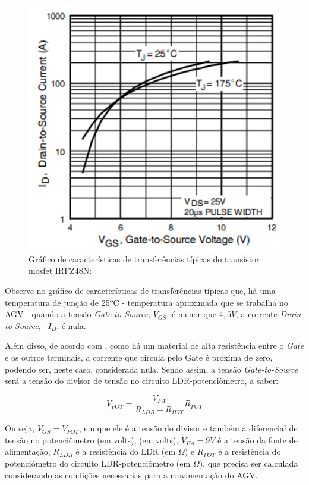 \documentclass[portuguese]{textolivre}
\begin{document}
\begin{figure}[h!]
\centering
\begin{minipage}{0.7\textwidth}
 \includegraphics[width=\textwidth]{figuras/figura 5.png}
 \caption{Gráfico de características de transferências típicas do transistor mosfet IRFZ48N:}
 \label{figura05}
\end{minipage}
\end{figure}

Observe no gráfico de características de transferências típicas que, há uma temperatura de junção de 25ºC - temperatura aproximada que se trabalha no AGV - quando a tensão \emph{Gate-to-Source}, $V_{GS}$, é menor que $4,5V$, a corrente \emph{Drain-to-Source}, ¨$I_D$, é nula.

Além disso, de acordo com \textcite[p. 63-65]{AlvesMonica2022}, como há um material de alta resistência entre o \emph{Gate} e os outros terminais, a corrente que circula pelo Gate é próxima de zero, podendo ser, neste caso, considerada nula. Sendo assim, a tensão \emph{Gate-to-Source} será a tensão do divisor de tensão no circuito LDR-potenciômetro, a saber:

$$V_{POT} = \frac{V_{FA}}{R_{LDR}+R_{POT}}R_{POT}$$

Ou seja, $V_{GS} = V_{POT}$, em que ele é a tensão do divisor e também a diferencial de tensão no potenciômetro (em volts), (em volts), $V_{FA} = 9V$ é a tensão da fonte de alimentação, $R_{LDR}$ é a resistência do LDR (em $\Omega$) e $R_{POT}$ é a resistência do potenciômetro do circuito LDR-potenciômetro (em $\Omega$), que precisa ser calculada considerando as condições necessárias para a movimentação do AGV.
\end{document}
